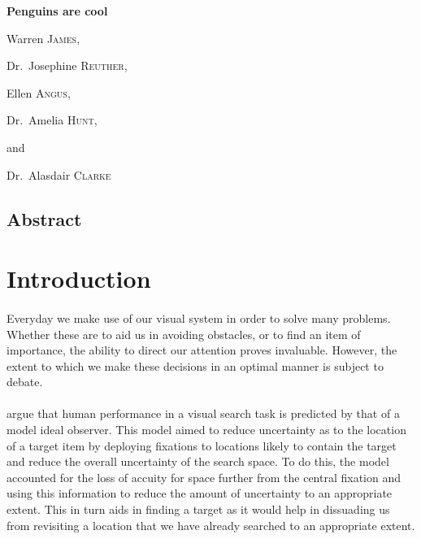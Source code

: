 \documentclass[12pt]{article}
\begin{document}
\begin{titlepage}
	\centering
	{\huge\bfseries Penguins are cool\par}
	\vspace{1cm}
	Warren \textsc{James}, \par
	Dr.~Josephine \textsc{Reuther}, \par
	Ellen \textsc{Angus}, \par
	Dr.~Amelia \textsc{Hunt},\par
	and\par
	Dr.~Alasdair \textsc{Clarke}
	\vfill
\end{titlepage}	


\newpage

\begin{center}
	\section*{Abstract}
\end{center}

\begingroup\singlespacing
\newpage
\tableofcontents
\newpage
\endgroup

\section*{Introduction}
\paragraph{} Everyday we make use of our visual system in order to solve many problems. Whether these are to aid us in avoiding obstacles, or to find an item of importance, the ability to direct our attention proves invaluable. However, the extent to which we make these decisions in an optimal manner is subject to debate. 

\paragraph{} \cite{najemnik2005optimal} argue that human performance in a visual search task is predicted by that of a model ideal observer. This model aimed to reduce uncertainty as to the location of a target item by deploying fixations to locations likely to contain the target and reduce the overall uncertainty of the search space. To do this, the model accounted for the loss of accuity for space further from the central fixation and using this information to reduce the amount of uncertainty to an appropriate extent. This in turn aids in finding a target as it would help in dissuading us from revisiting a location that we have already searched to an appropriate extent. 
\end{document}
